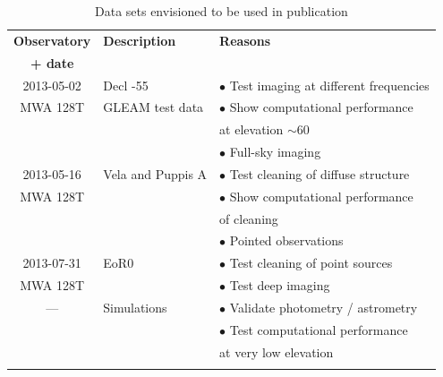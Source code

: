 \documentclass[a4paper,10pt]{article}
\begin{document}
\begin{table}
\caption{Data sets envisioned to be used in publication} \label{tbl:observations}
 \begin{tabular}{|c|l|p{6cm}|}
 \hhline{|=|=|=|}
 \textbf{Observatory} & \textbf{Description} & \textbf{Reasons} \\
 \textbf{+ date} & & \\
 \hhline{|=|=|=|}
  2013-05-02 & Decl -55          & $\bullet$ Test imaging at different frequencies\\
  MWA 128T   & GLEAM test data   & $\bullet$ Show computational performance \\
             &                   & \hspace{5mm} at elevation $\sim 60$\\
             &                   & $\bullet$ Full-sky imaging \\
 \hline
  2013-05-16 & Vela and Puppis A & $\bullet$ Test cleaning of diffuse structure \\
  MWA 128T   &                   & $\bullet$ Show computational performance \\
             &                   & \hspace{5mm} of cleaning\\
             &                   & $\bullet$ Pointed observations \\
 \hline
  2013-07-31 & EoR0              & $\bullet$ Test cleaning of point sources \\
  MWA 128T   &                   & $\bullet$ Test deep imaging \\
 \hline
  ---        & Simulations       & $\bullet$ Validate photometry / astrometry \\
             &                   & $\bullet$ Test computational performance \\
             &                   & \hspace{5mm} at very low elevation\\
 \hhline{|=|=|=|}
\end{tabular}
\end{table}

\label{lastpage}



\end{document}
